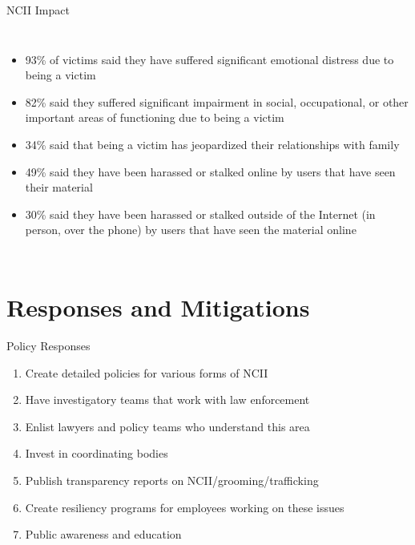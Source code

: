 \documentclass[nobackground,dvipsnames,table,aspectratio=169]{beamer}
\begin{document}
\begin{frame}{NCII Impact}
    \begin{columns}
            \begin{itemize}
                \item 93\% of victims said they have suffered significant emotional distress due to being a victim
                \item 82\% said they suffered significant impairment in social, occupational, or other important areas of functioning due to being a victim
                \item 34\% said that being a victim has jeopardized their relationships with family
                \item 49\% said they have been harassed or stalked online by users that have seen their material
                \item 30\% said they have been harassed or stalked outside of the Internet (in person, over the phone) by users that have seen the material online
            \end{itemize}
    \end{columns}
\end{frame}

\section{Responses and Mitigations}

\begin{frame}{Policy Responses}
    \large
    \begin{enumerate}
        \item Create detailed policies for various forms of NCII
        \item Have investigatory teams that work with law enforcement
        \item Enlist lawyers and policy teams who understand this area
        \item Invest in coordinating bodies
        \item Publish transparency reports on NCII/grooming/trafficking
        \item Create resiliency programs for employees working on these issues
        \item Public awareness and education
    \end{enumerate}
\end{frame}
\end{document}
